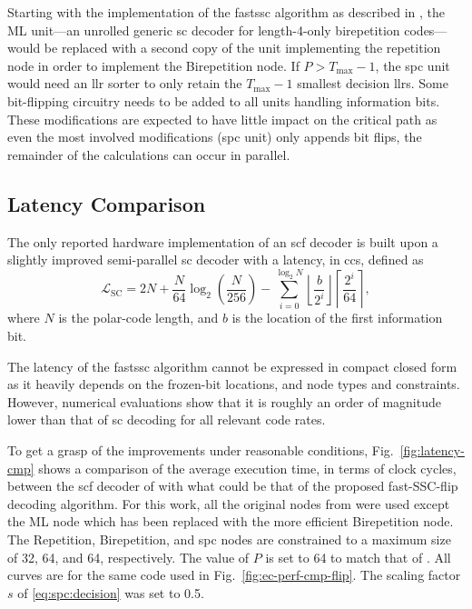 \documentclass[conference]{IEEEtran}
\begin{document}
Starting with the implementation of the \gls{fastssc} algorithm as described in \cite{Sarkis_JSAC_2014}, the ML unit---an unrolled generic \gls{sc} decoder for length-4-only birepetition codes---would be replaced with a second copy of the unit implementing the repetition node in order to implement the Birepetition node. If $P > T_{\max}-1$, the \gls{spc} unit would need an \gls{llr} sorter to only retain the $T_{\max}-1$ smallest decision \glspl{llr}. Some bit-flipping circuitry needs to be added to all units handling information bits. These modifications are expected to have little impact on the critical path as even the most involved modifications (\gls{spc} unit) only appends bit flips, the remainder of the calculations can occur in parallel.

\subsection*{Latency Comparison}
The only reported hardware implementation of an \gls{scf} decoder \cite{Giard_JETCAS_2017} is built upon a slightly improved semi-parallel \gls{sc} decoder with a latency, in \glspl{cc}, defined as
\begin{equation}\label{eqn:latency:sc}
  \mathcal{L}_{\text{SC}} = 2N+\frac{N}{64}\log_2\left(\frac{N}{256}\right) -
  \sum\limits_{i=0}^{\log_2N} \left\lfloor \frac{b}{2^i}\right\rfloor \left\lceil \frac{2^i}{64} \right\rceil,
\end{equation}
where $N$ is the polar-code length, and $b$ is the location of the first information bit.

The latency of the \gls{fastssc} algorithm cannot be expressed in compact closed form as it heavily depends on the frozen-bit locations, and node types and constraints. However, numerical evaluations show that it is roughly an order of magnitude lower than that of \gls{sc} decoding for all relevant code rates.

To get a grasp of the improvements under reasonable conditions, Fig.~\ref{fig:latency-cmp} shows a comparison of the average execution time, in terms of clock cycles, between the \gls{scf} decoder of \cite{Giard_JETCAS_2017} with what could be that of the proposed fast-SSC-flip decoding algorithm. For this work, all the original nodes from \cite{Sarkis_JSAC_2014} were used except the ML node which has been replaced with the more efficient Birepetition node. The Repetition, Birepetition, and \gls{spc} nodes are constrained to a maximum size of 32, 64, and 64, respectively. The value of $P$ is set to 64 to match that of \cite{Giard_JETCAS_2017}. All curves are for the same code used in Fig.~\ref{fig:ec-perf-cmp-flip}. The scaling factor $s$ of \eqref{eq:spc:decision} was set to 0.5.
\end{document}
